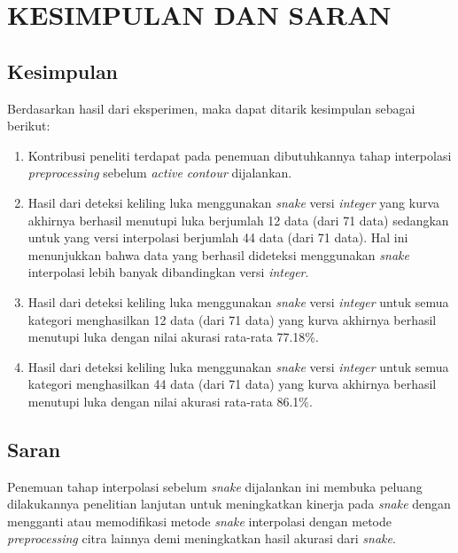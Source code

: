 
\chapter{KESIMPULAN DAN SARAN}

\section{Kesimpulan}
Berdasarkan hasil dari eksperimen, maka dapat ditarik kesimpulan sebagai berikut:
\begin{enumerate}
	\item Kontribusi peneliti terdapat pada penemuan dibutuhkannya tahap interpolasi \emph{preprocessing} sebelum \emph{active contour} dijalankan.
	\item Hasil dari deteksi keliling luka menggunakan \emph{snake} versi \emph{integer} yang kurva akhirnya berhasil menutupi luka berjumlah 12 data (dari 71 data) sedangkan untuk yang versi interpolasi berjumlah 44 data (dari 71 data). Hal ini menunjukkan bahwa data yang berhasil dideteksi menggunakan \emph{snake} interpolasi lebih banyak dibandingkan versi \emph{integer}.
	\item Hasil dari deteksi keliling luka menggunakan \emph{snake} versi \emph{integer} untuk semua kategori menghasilkan 12 data (dari 71 data) yang kurva akhirnya berhasil menutupi luka dengan nilai akurasi rata-rata 77.18\%.
	\item Hasil dari deteksi keliling luka menggunakan \emph{snake} versi \emph{integer} untuk semua kategori menghasilkan 44 data (dari 71 data) yang kurva akhirnya berhasil menutupi luka dengan nilai akurasi rata-rata 86.1\%.
\end{enumerate}

\section{Saran}
Penemuan tahap interpolasi sebelum \emph{snake} dijalankan ini membuka peluang dilakukannya penelitian lanjutan untuk meningkatkan kinerja pada \emph{snake} dengan mengganti atau memodifikasi metode \emph{snake} interpolasi dengan metode \emph{preprocessing} citra lainnya demi meningkatkan hasil akurasi dari \emph{snake}.
\begin{comment}

\end{comment}